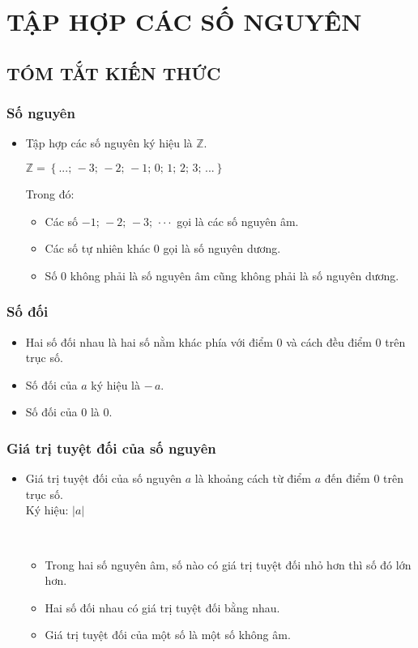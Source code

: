 \section{TẬP HỢP CÁC SỐ NGUYÊN}
\subsection{TÓM TẮT KIẾN THỨC}
\begin{tomtat}
	\subsubsection{Số nguyên}
\begin{itemize}
\item Tập hợp các số nguyên ký hiệu là $\mathbb{Z}$.
\begin{center}
$\mathbb{Z} = \left\{ {...;\, - 3;\, - 2;\, - 1;\,0;\,1;\,2;\,3;\,...} \right\}$
\end{center}
Trong đó:
\begin{itemize}
\item Các số $-1; \,-2; \, -3; \,\cdot \cdot \cdot$ gọi là các số nguyên âm.
\item Các số tự nhiên khác $0$ gọi là số nguyên dương.
\item Số $0$ không phải là số nguyên âm cũng không phải là số nguyên dương.
\end{itemize}
\end{itemize}
	\subsubsection{Số đối}
\begin{itemize}
\item Hai số đối nhau là hai số nằm khác phía với điểm $0$ và cách đều điểm $0$ trên trục số.
\item Số đối của $a$ ký hiệu là $-\,a$.
\item Số đối của $0$ là $0$.
\end{itemize}
	\subsubsection{Giá trị tuyệt đối của số nguyên}
\begin{itemize}
\item Giá trị tuyệt đối của số nguyên $a$ là khoảng cách từ điểm $a$ đến điểm $0$ trên trục số.\\
Ký hiệu: $\left| a \right|$
\begin{nx}~
\begin{itemize}
\item Trong hai số nguyên âm, số nào có giá trị tuyệt đối nhỏ hơn thì số đó lớn hơn.
\item Hai số đối nhau có giá trị tuyệt đối bằng nhau.
\item Giá trị tuyệt đối của một số là một số không âm.
\end{itemize}
\end{nx}
\end{itemize}
\end{tomtat}
